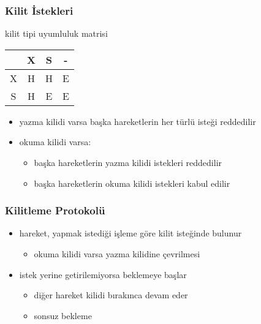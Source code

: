 \documentclass[dvipsnames]{beamer}
\theoremstyle{definition}
\theoremstyle{example}
\theoremstyle{plain}
\begin{document}
\begin{frame}
  \frametitle{Kilit İstekleri}

  \begin{block}{kilit tipi uyumluluk matrisi}
    \begin{table}
      \begin{tabular}{|c||c|c|c|}\hline
  & X & S & -\\\hline\hline
X & H & H & E\\\hline
S & H & E & E\\\hline
      \end{tabular}
    \end{table}
  \end{block}

  \begin{itemize}
    \item yazma kilidi varsa başka hareketlerin her türlü isteği reddedilir

    \pause
    \item okuma kilidi varsa:
    \begin{itemize}
      \item başka hareketlerin yazma kilidi istekleri reddedilir
      \item başka hareketlerin okuma kilidi istekleri kabul edilir
    \end{itemize}
  \end{itemize}
\end{frame}

\begin{frame}
  \frametitle{Kilitleme Protokolü}

  \begin{itemize}
    \item hareket, yapmak istediği işleme göre kilit isteğinde bulunur
    \begin{itemize}
      \item okuma kilidi varsa yazma kilidine çevrilmesi
    \end{itemize}

    \pause
    \item istek yerine getirilemiyorsa beklemeye başlar
    \begin{itemize}
      \item diğer hareket kilidi bırakınca devam eder
      \item \alert{sonsuz bekleme}
    \end{itemize}
  \end{itemize}
\end{frame}
\end{document}
